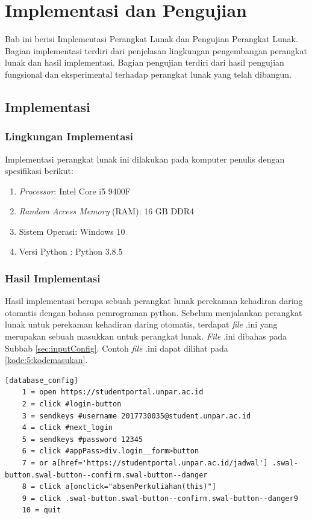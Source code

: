 \chapter{Implementasi dan Pengujian}
\label{chap:implementasidanpengujian}
Bab ini berisi Implementasi Perangkat Lunak dan Pengujian Perangkat Lunak. Bagian implementasi terdiri dari penjelasan lingkungan pengembangan perangkat lunak dan hasil implementasi. Bagian pengujian terdiri dari hasil pengujian fungsional dan eksperimental terhadap perangkat lunak yang telah dibangun.

\section{Implementasi}
\label{sec:implementasi} 

\subsection{Lingkungan Implementasi}
Implementasi perangkat lunak ini dilakukan pada komputer penulis dengan spesifikasi berikut:
\begin{enumerate}
	\item \textit{Processor}: Intel Core i5 9400F
	\item \textit{Random Access Memory} (RAM): 16 GB DDR4
	\item Sistem Operasi: Windows 10
	\item Versi Python : Python 3.8.5
\end{enumerate}

\subsection{Hasil Implementasi}
Hasil implementasi berupa sebuah perangkat lunak perekaman kehadiran daring otomatis dengan bahasa pemrograman python. Sebelum menjalankan perangkat lunak untuk perekaman kehadiran daring otomatis, terdapat \textit{file} .ini yang merupakan sebuah masukkan untuk perangkat lunak. \textit{File} .ini dibahas pada Subbab \ref{sec:inputConfig}. Contoh \textit{file} .ini dapat dilihat pada \ref{kode:5:kodemasukan}.
\begin{lstlisting}[caption=Contoh \textit{file} .ini untuk Masukan Perangkat Lunak Perekaman Kehadiran Daring Otomatis, label=kode:5:kodemasukan]
	[database_config]
	1 = open https://studentportal.unpar.ac.id
	2 = click #login-button
	3 = sendkeys #username 2017730035@student.unpar.ac.id 
	4 = click #next_login
	5 = sendkeys #password 12345
	6 = click #appPass>div.login__form>button
	7 = or a[href='https://studentportal.unpar.ac.id/jadwal'] .swal-button.swal-button--confirm.swal-button--danger
	8 = click a[onclick="absenPerkuliahan(this)"]
	9 = click .swal-button.swal-button--confirm.swal-button--danger9
	10 = quit
\end{lstlisting}

